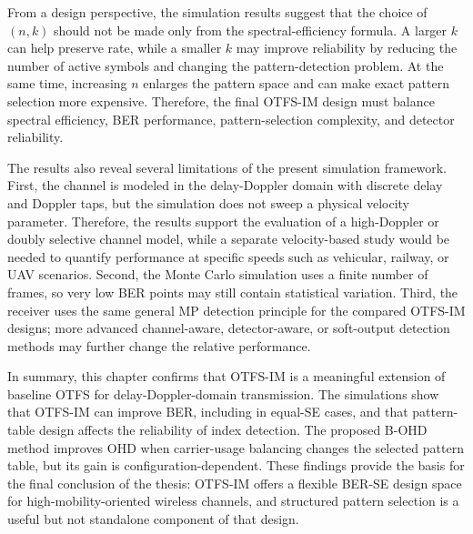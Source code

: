 From a design perspective, the simulation results suggest that the choice of \((n,k)\) should not be made only from the spectral-efficiency formula. A larger \(k\) can help preserve rate, while a smaller \(k\) may improve reliability by reducing the number of active symbols and changing the pattern-detection problem. At the same time, increasing \(n\) enlarges the pattern space and can make exact pattern selection more expensive. Therefore, the final OTFS-IM design must balance spectral efficiency, BER performance, pattern-selection complexity, and detector reliability.

The results also reveal several limitations of the present simulation framework. First, the channel is modeled in the delay-Doppler domain with discrete delay and Doppler taps, but the simulation does not sweep a physical velocity parameter. Therefore, the results support the evaluation of a high-Doppler or doubly selective channel model, while a separate velocity-based study would be needed to quantify performance at specific speeds such as vehicular, railway, or UAV scenarios. Second, the Monte Carlo simulation uses a finite number of frames, so very low BER points may still contain statistical variation. Third, the receiver uses the same general MP detection principle for the compared OTFS-IM designs; more advanced channel-aware, detector-aware, or soft-output detection methods may further change the relative performance.

In summary, this chapter confirms that OTFS-IM is a meaningful extension of baseline OTFS for delay-Doppler-domain transmission. The simulations show that OTFS-IM can improve BER, including in equal-SE cases, and that pattern-table design affects the reliability of index detection. The proposed B-OHD method improves OHD when carrier-usage balancing changes the selected pattern table, but its gain is configuration-dependent. These findings provide the basis for the final conclusion of the thesis: OTFS-IM offers a flexible BER-SE design space for high-mobility-oriented wireless channels, and structured pattern selection is a useful but not standalone component of that design.
